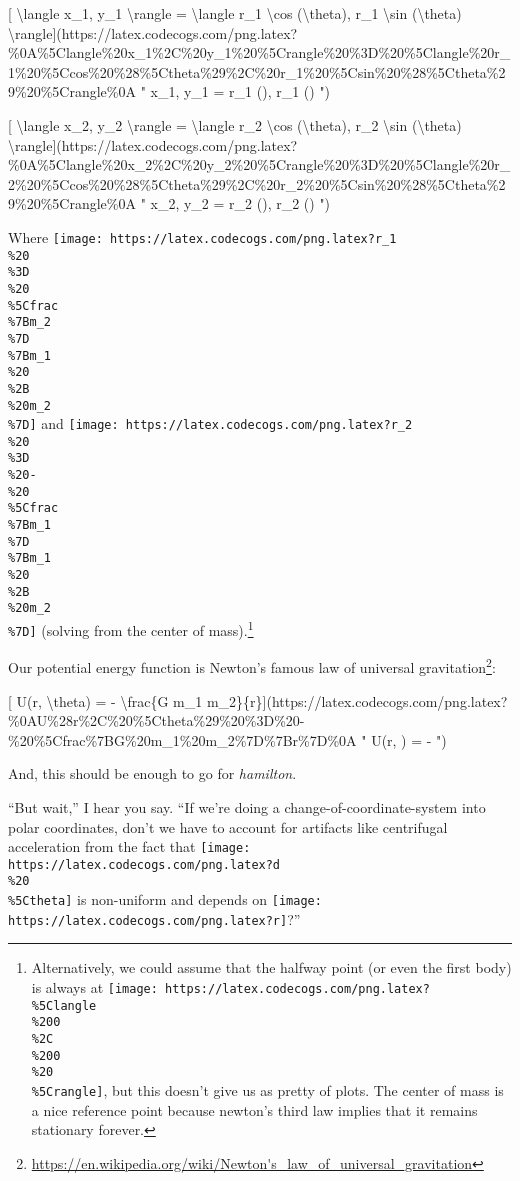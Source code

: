 \documentclass[]{article}
\renewcommand{\href}[2]{#2\footnote{\url{#1}}}
\begin{document}
{[} \textbackslash{}langle x\_1, y\_1 \textbackslash{}rangle =
\textbackslash{}langle r\_1 \textbackslash{}cos (\textbackslash{}theta), r\_1
\textbackslash{}sin (\textbackslash{}theta)
\textbackslash{}rangle{]}(https://latex.codecogs.com/png.latex?\%0A\%5Clangle\%20x\_1\%2C\%20y\_1\%20\%5Crangle\%20\%3D\%20\%5Clangle\%20r\_1\%20\%5Ccos\%20\%28\%5Ctheta\%29\%2C\%20r\_1\%20\%5Csin\%20\%28\%5Ctheta\%29\%20\%5Crangle\%0A
" \langle x\_1, y\_1 \rangle = \langle r\_1 \cos (\theta), r\_1 \sin (\theta)
\rangle ")

{[} \textbackslash{}langle x\_2, y\_2 \textbackslash{}rangle =
\textbackslash{}langle r\_2 \textbackslash{}cos (\textbackslash{}theta), r\_2
\textbackslash{}sin (\textbackslash{}theta)
\textbackslash{}rangle{]}(https://latex.codecogs.com/png.latex?\%0A\%5Clangle\%20x\_2\%2C\%20y\_2\%20\%5Crangle\%20\%3D\%20\%5Clangle\%20r\_2\%20\%5Ccos\%20\%28\%5Ctheta\%29\%2C\%20r\_2\%20\%5Csin\%20\%28\%5Ctheta\%29\%20\%5Crangle\%0A
" \langle x\_2, y\_2 \rangle = \langle r\_2 \cos (\theta), r\_2 \sin (\theta)
\rangle ")

Where
\texttt{[image: https://latex.codecogs.com/png.latex?r\_1\\\%20\\\%3D\\\%20\\\%5Cfrac\\\%7Bm\_2\\\%7D\\\%7Bm\_1\\\%20\\\%2B\\\%20m\_2\\\%7D]}
and
\texttt{[image: https://latex.codecogs.com/png.latex?r\_2\\\%20\\\%3D\\\%20-\\\%20\\\%5Cfrac\\\%7Bm\_1\\\%7D\\\%7Bm\_1\\\%20\\\%2B\\\%20m\_2\\\%7D]}
(solving from the center of mass).\footnote{Alternatively, we could assume that
  the halfway point (or even the first body) is always at
  \texttt{[image: https://latex.codecogs.com/png.latex?\\\%5Clangle\\\%200\\\%2C\\\%200\\\%20\\\%5Crangle]},
  but this doesn't give us as pretty of plots. The center of mass is a nice
  reference point because newton's third law implies that it remains stationary
  forever.}

Our potential energy function is Newton's famous
\href{https://en.wikipedia.org/wiki/Newton's_law_of_universal_gravitation}{law
of universal gravitation}:

{[} U(r, \textbackslash{}theta) = - \textbackslash{}frac\{G m\_1
m\_2\}\{r\}{]}(https://latex.codecogs.com/png.latex?\%0AU\%28r\%2C\%20\%5Ctheta\%29\%20\%3D\%20-\%20\%5Cfrac\%7BG\%20m\_1\%20m\_2\%7D\%7Br\%7D\%0A
" U(r, \theta) = -  ")

And, this should be enough to go for \emph{hamilton}.

``But wait,'' I hear you say. ``If we're doing a change-of-coordinate-system
into polar coordinates, don't we have to account for artifacts like centrifugal
acceleration from the fact that
\texttt{[image: https://latex.codecogs.com/png.latex?d\\\%20\\\%5Ctheta]} is
non-uniform and depends on
\texttt{[image: https://latex.codecogs.com/png.latex?r]}?''
\end{document}
